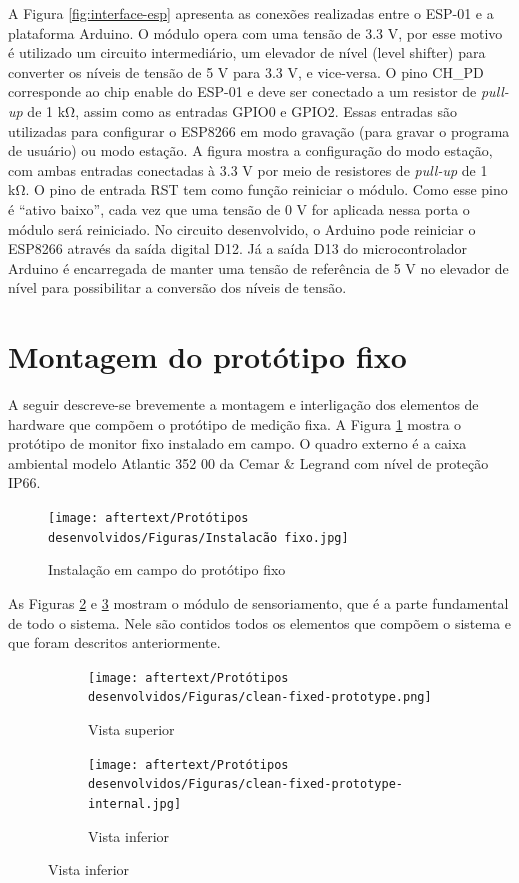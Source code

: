 A Figura \ref{fig:interface-esp} apresenta as conexões realizadas entre o ESP-01 e a plataforma Arduino. O módulo opera com uma tensão de 3.3 V, por esse motivo é utilizado um circuito intermediário, um elevador de nível (level shifter) para converter os níveis de tensão de 5 V para 3.3 V, e vice-versa. O pino CH\_PD corresponde ao chip enable do ESP-01 e deve ser conectado a um resistor de \textit{pull-up} de 1 kΩ, assim como as entradas GPIO0 e GPIO2. Essas entradas são utilizadas para configurar o ESP8266 em modo gravação (para gravar o programa de usuário) ou modo estação. A figura mostra a configuração do modo estação, com ambas entradas conectadas à 3.3 V por meio de resistores de \textit{pull-up} de 1 kΩ. O pino de entrada RST tem como função reiniciar o módulo. Como esse pino é “ativo baixo”, cada vez que uma tensão de 0 V for aplicada nessa porta o módulo será reiniciado. No circuito desenvolvido, o Arduino pode reiniciar o ESP8266 através da saída digital D12. Já a saída D13 do microcontrolador Arduino é encarregada de manter uma tensão de referência de 5 V no elevador de nível para possibilitar a conversão dos níveis de tensão.

\section{Montagem do protótipo fixo}

A seguir descreve-se brevemente a montagem e interligação dos elementos de hardware que compõem o protótipo de medição fixa. A Figura \ref{fig:fixed-prototype-field-inst} mostra o protótipo de monitor fixo instalado em campo. O quadro externo é a caixa ambiental modelo Atlantic 352 00 da Cemar \& Legrand com nível de proteção IP66.

\begin{figure}[h]
    \centering
    \caption{Instalação em campo do protótipo fixo}
    \texttt{[image: aftertext/Protótipos desenvolvidos/Figuras/Instalacão fixo.jpg]}
    \label{fig:fixed-prototype-field-inst}
\end{figure}

As Figuras \ref{fig:fixed-prototype} e \ref{fig:fixed-prototype-int} mostram o módulo de sensoriamento, que é a parte fundamental de todo o sistema. Nele são contidos todos os elementos que compõem o sistema e que foram descritos anteriormente.

\begin{figure}[h]
    \centering
    \caption{Vista interior do protótipo fixo}
    \begin{subfigure}{0.495\textwidth}
        \centering
        \texttt{[image: aftertext/Protótipos desenvolvidos/Figuras/clean-fixed-prototype.png]}
        \caption{Vista superior}
        \label{fig:fixed-prototype}
    \end{subfigure}
    \hfill
    \begin{subfigure}{0.495\textwidth}
        \centering
        \texttt{[image: aftertext/Protótipos desenvolvidos/Figuras/clean-fixed-prototype-internal.jpg]}
        \caption{Vista inferior}
        \label{fig:fixed-prototype-int}
    \end{subfigure}
    \label{fig:prototypes}
\end{figure}


